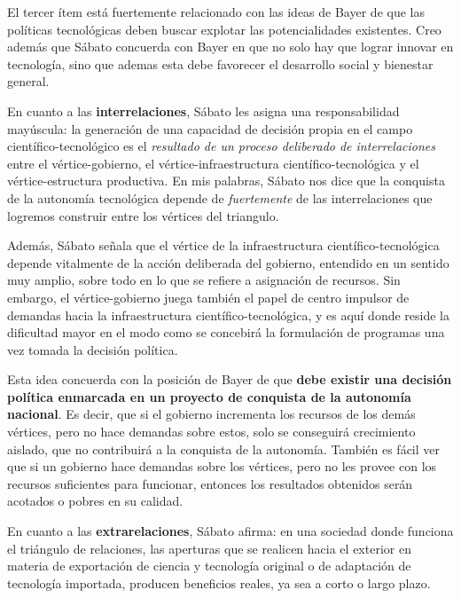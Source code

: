 El tercer ítem está fuertemente relacionado con las ideas de Bayer de que las políticas tecnológicas deben buscar explotar las potencialidades existentes. Creo además que Sábato concuerda con Bayer en que no solo hay que lograr innovar en tecnología, sino que ademas esta debe favorecer el desarrollo social y bienestar general.

\vspace{0.5em}

En cuanto a las \textbf{interrelaciones}, Sábato les asigna una responsabilidad mayúscula: la generación de una capacidad de decisión propia en el campo científico-tecnológico es el \textit{resultado de un proceso deliberado de interrelaciones} entre el vértice-gobierno, el vértice-infraestructura científico-tecnológica y el vértice-estructura productiva.
En mis palabras, Sábato nos dice que la conquista de la autonomía tecnológica depende de \textit{fuertemente} de las interrelaciones que logremos construir entre los vértices del triangulo.

Además, Sábato señala que el vértice de la infraestructura científico-tecnológica depende vitalmente de la acción deliberada del gobierno, entendido en un sentido muy amplio, sobre todo en lo que se refiere a asignación de recursos. Sin embargo, el vértice-gobierno juega también el papel de centro impulsor de demandas hacia la infraestructura científico-tecnológica, y es aquí donde reside la dificultad mayor en el modo como se concebirá la formulación de programas una vez tomada la decisión política.

Esta idea concuerda con la posición de Bayer de que \textbf{debe existir una decisión política enmarcada en un proyecto de conquista de la autonomía nacional}. Es decir, que si el gobierno incrementa los recursos de los demás vértices, pero no hace demandas sobre estos, solo se conseguirá crecimiento aislado, que no contribuirá a la conquista de la autonomía. También es fácil ver que si un gobierno hace demandas sobre los vértices, pero no les provee con los recursos suficientes para funcionar, entonces los resultados obtenidos serán acotados o pobres en su calidad.

\vspace{0.5em}

En cuanto a las \textbf{extrarelaciones}, Sábato afirma: en una sociedad donde funciona el triángulo de relaciones, las aperturas que se realicen hacia el exterior en materia de exportación de ciencia y tecnología original o de adaptación de tecnología importada, producen beneficios reales, ya sea a corto o largo plazo.

